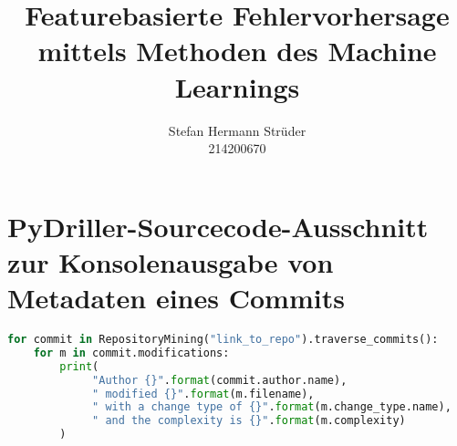 \documentclass[master,twoside,extern,palatino]{rgseThesis}
\author{Stefan Hermann Strüder\par{}214200670}
\title{Featurebasierte Fehlervorhersage mittels Methoden des Machine Learnings}
\begin{document}

    \maketitle

    
    
    
    
    

    \tableofcontents
    \cleardoublepage

    \listoffigures   %
    \cleardoublepage
    
    \listoftables   %
    \cleardoublepage


    

    

    
    
    
    
    
    
    
    
    
    


    \printbibliography[heading=bibintoc]

\appendix

\chapter{PyDriller-Sourcecode-Ausschnitt zur Konsolenausgabe von Metadaten eines Commits}
\label{appendix4}

\begin{lstlisting}[language=Python, caption=Beispielhafter PyDriller-Code zur Ausgabe von Metadaten von Commits, frame=single, label=pydriller]
for commit in RepositoryMining("link_to_repo").traverse_commits(): 
	for m in commit.modifications: 
		print( 
		     "Author {}".format(commit.author.name),
		     " modified {}".format(m.filename),
		     " with a change type of {}".format(m.change_type.name),
		     " and the complexity is {}".format(m.complexity)
		)
\end{lstlisting}
\end{document}
